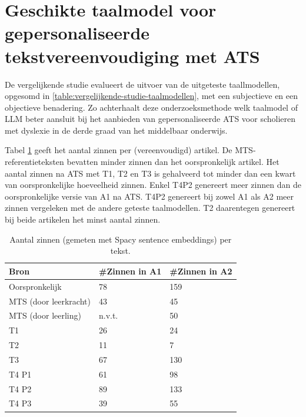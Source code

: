 \section{Geschikte taalmodel voor gepersonaliseerde tekstvereenvoudiging met ATS}

De vergelijkende studie evalueert de uitvoer van de uitgeteste taallmodellen, opgesomd in \ref{table:vergelijkende-studie-taalmodellen}, met een subjectieve en een objectieve benadering. Zo achterhaalt deze onderzoeksmethode welk taalmodel of LLM beter aansluit bij het aanbieden van gepersonaliseerde ATS voor scholieren met dyslexie in de derde graad van het middelbaar onderwijs. 

\medspace

Tabel \ref{table:resultaten-aantal-zinnen} geeft het aantal zinnen per (vereenvoudigd) artikel. De MTS-referentieteksten bevatten minder zinnen dan het oorspronkelijk artikel. Het aantal zinnen na ATS met T1, T2 en T3 is gehalveerd tot minder dan een kwart van oorspronkelijke hoeveelheid zinnen. Enkel T4P2 genereert meer zinnen dan de oorspronkelijke versie van A1 na ATS. T4P2 genereert bij zowel A1 als A2 meer zinnen vergeleken met de andere geteste taalmodellen. T2 daarentegen genereert bij beide artikelen het minst aantal zinnen.

\medspace


\begin{table}[h]
	\centering
	\begin{tabular}{ | m{3cm} | m{3cm} | m{3cm} | } 
		\hline
		\textbf{Bron} & \textbf{#Zinnen in A1} & \textbf{#Zinnen in A2} \\
		\hline
		Oorspronkelijk & 78  & 159 \\ 
		\hline
		MTS (door leerkracht) & 43 & 45 \\
		\hline
		MTS (door leerling) & n.v.t. & 50 \\
		\hline
		T1 & 26 & 24 \\
		\hline
		T2 & 11 & 7 \\
		\hline
		T3 & 67 & 130 \\
		\hline
		T4 P1 & 61 & 98 \\
		\hline
		T4 P2 & 89 & 133 \\
		\hline
		T4 P3 & 39 & 55 \\
		\hline
	\end{tabular}
	\caption{Aantal zinnen (gemeten met Spacy sentence embeddings) per tekst.}
	\label{table:resultaten-aantal-zinnen}
\end{table}

